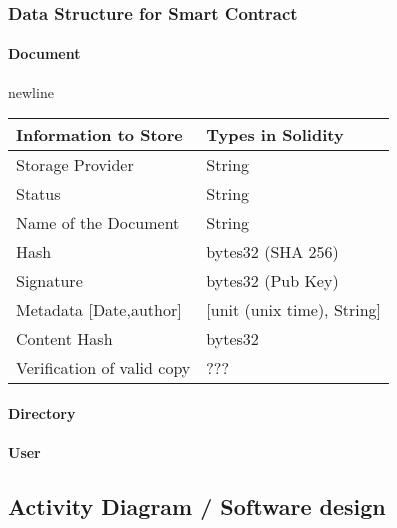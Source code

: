\subsubsection{Data Structure for Smart Contract}

\paragraph{Document}
newline
\begin{tabular}{|l|l|}
\hline
	Information to Store & Types in Solidity\\
\hline
	Storage Provider & String\\
\hline
	Status & String\\
\hline
	Name of the Document  & String\\
\hline
	Hash & bytes32 (SHA 256)\\
\hline
	Signature & bytes32 (Pub Key)\\
\hline
	Metadata [Date,author] & [unit (unix time), String]\\
\hline
	Content Hash & bytes32\\
\hline
	Verification of valid copy & ???\\
\hline
\end{tabular}
\paragraph{Directory}
\paragraph{User}

\subsection{Activity Diagram / Software design}
